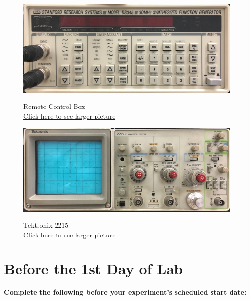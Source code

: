\documentclass{../lab}
\begin{document}
\begin{figure}[H]
\captionsetup{justification=centering}
  \href{http://experimentationlab.berkeley.edu/sites/default/files/images/LLSimage_SRS_DS345.jpg}{\includegraphics[width=\linewidth,keepaspectratio]{images/LLSimage_SRS_DS345.jpg}}
  \caption{Remote Control Box \\ \href{http://experimentationlab.berkeley.edu/sites/default/files/images/LLSimage_SRS_DS345.jpg}{Click here to see larger picture}}
  \label{fig:LLSimage_SRS_DS345.jpg}
\endminipage\hfill
{}
  \href{http://experimentationlab.berkeley.edu/sites/default/files/images/LLSimage_Tektronix2215.jpg}{\includegraphics[width=\linewidth,keepaspectratio]{images/LLSimage_Tektronix2215.jpg}}
  \caption{Tektronix 2215\\
  \href{http://experimentationlab.berkeley.edu/sites/default/files/images/LLSimage_Tektronix2215.jpg}{Click here to see larger picture}}
  \label{fig:LLSimage_Tektronix2215.jpg}
\endminipage
\end{figure}

\section{Before the 1st Day of Lab}

\textbf{Complete the following before your experiment's scheduled start date:}
\end{document}
